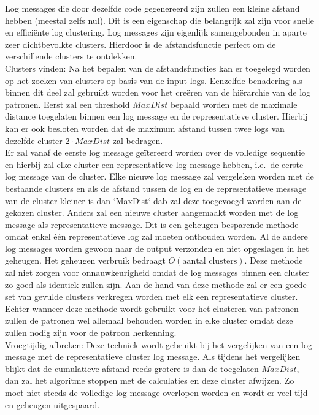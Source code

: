 \begin{itemize}
    Log messages die door dezelfde code gegenereerd zijn zullen een kleine afstand hebben (meestal zelfs nul). Dit is een eigenschap die belangrijk zal zijn voor snelle en efficiënte log clustering. Log messages zijn eigenlijk samengebonden in aparte zeer dichtbevolkte clusters. Hierdoor is de afstandsfunctie perfect om de verschillende clusters te ontdekken.\\
    
    \subitem Clusters vinden: Na het bepalen van de afstandsfuncties kan er toegelegd worden op het zoeken van clusters op basis van de input logs. Eenzelfde benadering als binnen dit deel zal gebruikt worden voor het creëren van de hiërarchie van de log patronen. Eerst zal een threshold \(MaxDist\) bepaald worden met de maximale distance toegelaten binnen een log message en de representatieve cluster. Hierbij kan er ook besloten worden dat de maximum afstand tussen twee logs van dezelfde cluster \(2 \cdot MaxDist\) zal bedragen.\\
    
    Er zal vanaf de eerste log message geïtereerd worden over de volledige sequentie en hierbij zal elke cluster een representatieve log message hebben, i.e.\ de eerste log message van de cluster. Elke nieuwe log message zal vergeleken worden met de bestaande clusters en als de afstand tussen de log en de representatieve message van de cluster kleiner is dan `MaxDist` dab zal deze toegevoegd worden aan de gekozen cluster. Anders zal een nieuwe cluster aangemaakt worden met de log message als representatieve message. Dit is een geheugen besparende methode omdat enkel één representatieve log zal moeten onthouden worden. Al de andere log messages worden gewoon naar de output verzonden en niet opgeslagen in het geheugen. Het geheugen verbruik bedraagt \(O(\text{aantal clusters})\). Deze methode zal niet zorgen voor onnauwkeurigheid omdat de log messages binnen een cluster zo goed als identiek zullen zijn. Aan de hand van deze methode zal er een goede set van gevulde clusters verkregen worden met elk een representatieve cluster. Echter wanneer deze methode wordt gebruikt voor het clusteren van patronen zullen de patronen wel allemaal behouden worden in elke cluster omdat deze zullen nodig zijn voor de patroon herkenning.\\
    
    \subitem Vroegtijdig afbreken: Deze techniek wordt gebruikt bij het vergelijken van een log message met de representatieve cluster log message. Als tijdens het vergelijken blijkt dat de cumulatieve afstand reeds grotere is dan de toegelaten \(MaxDist\), dan zal het algoritme stoppen met de calculaties en deze cluster afwijzen. Zo moet niet steeds de volledige log message overlopen worden en wordt er veel tijd en geheugen uitgespaard.\\
    

\end{itemize}
